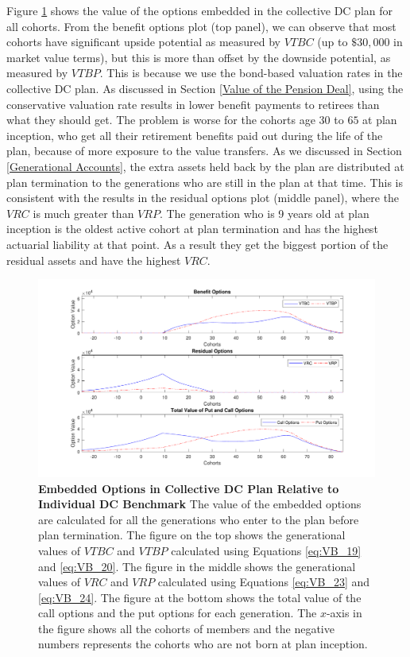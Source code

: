 \documentclass{sfuthesis}
\numberwithin{equation}{chapter}
\begin{document}
	
		\justify
		Figure \ref{fig:Surplus and Deficit Options} shows the value of the options embedded in the collective DC plan for all cohorts. From the benefit options plot (top panel), we can observe that most cohorts have significant upside potential as measured by $VTBC$ (up to $\$30{,}000$ in market value terms), but this is more than offset by the downside potential, as measured by $VTBP$. This is because we use the bond-based valuation rates in the collective DC plan. As discussed in Section \ref{Value of the Pension Deal}, using the conservative valuation rate results in lower benefit payments to retirees than what they should get. The problem is worse for the cohorts age $30$ to $65$ at plan inception, who get all their retirement benefits paid out during the life of the plan, because of more exposure to the value transfers. As we discussed in Section \ref{Generational Accounts}, the extra assets held back by the plan are distributed at plan termination to the generations who are still in the plan at that time. This is consistent with the results in the residual options plot (middle panel), where the $VRC$ is much greater than $VRP$. The generation who is 9 years old at plan inception is the oldest active cohort at plan termination and has the highest actuarial liability at that point. As a result they get the biggest portion of the residual assets and have the highest $VRC$. 
		\begin{figure}[h]
			\includegraphics[width=1\linewidth]{ResultPlot/SDOptions.pdf} 
			\caption[Embedded Options in Collective DC Plan Relative to Individual DC Benchmark]{\textbf{Embedded Options in Collective DC Plan Relative to Individual DC Benchmark}
				\vspace{-0.4cm}				
				\newline\footnotesize\justify The value of the embedded options are calculated for all the generations who enter to the plan before plan termination. The figure on the top shows the generational values of $VTBC$ and $VTBP$ calculated using Equations \eqref{eq:VB_19} and \eqref{eq:VB_20}. The figure in the middle shows the generational values of $VRC$ and $VRP$ calculated using Equations \eqref{eq:VB_23} and \eqref{eq:VB_24}. The figure at the bottom shows the total value of the call options and the put options for each generation. The $x$-axis in the figure shows all the cohorts of members and the negative numbers represents the cohorts who are not born at plan inception. }
			\label{fig:Surplus and Deficit Options}
	\end{figure}
	
\end{document}
